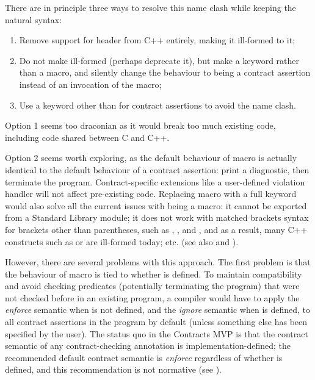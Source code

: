 There are in principle three ways to resolve this name clash while keeping the natural syntax:

\begin{enumerate}
\item Remove support for header  from C++ entirely, making it ill-formed to  it;
\item Do not make  ill-formed (perhaps deprecate it), but make  a keyword rather than a macro, and silently change the behaviour to being a contract assertion instead of an invocation of the macro;
\item Use a keyword other than  for contract assertions to avoid the name clash.
\end{enumerate}

Option 1 seems too draconian as it would break too much existing code, including code shared between C and C++.

Option 2 seems worth exploring, as the default behaviour of macro  is actually identical to the default behaviour of a contract assertion: print a diagnostic, then terminate the program. Contract-specific extensions like a user-defined violation handler will not affect pre-existing code. Replacing macro  with a full keyword would also solve all the current issues with  being a macro: it cannot be exported from a Standard Library module; it does not work with matched brackets syntax for brackets other than parentheses, such as , , and \tcode{[...]}, and as a result, many C++ constructs such as  or  are ill-formed today; etc. (see also \cite{P2264R5} and \cite{P2884R0}).

However, there are several problems with this approach. The first problem is that the behaviour of macro  is tied to whether  is defined. To maintain compatibility and avoid checking predicates (potentially terminating the program) that were not checked before in an existing program, a compiler would have to apply the \emph{enforce} semantic when  is not defined, and the \emph{ignore} semantic when  is defined, to all contract assertions in the program by default (unless something else has been specified by the user). The status quo in the Contracts MVP is that the contract semantic of any contract-checking annotation is implementation-defined; the recommended default contract semantic is \emph{enforce} regardless of whether  is defined, and this recommendation is not normative (see \cite{P2877R0}).

